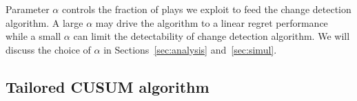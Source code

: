 \documentclass[letterpaper]{article} %
\begin{document}

Parameter $\alpha$ 
controls the fraction of plays we exploit to feed the change detection algorithm. A large $\alpha$ may drive the algorithm to a linear regret performance while a small $\alpha$ can limit the detectability of change detection algorithm. We will discuss the choice of $\alpha$ in Sections~\ref{sec:analysis} and~\ref{sec:simul}.

\subsection{Tailored CUSUM algorithm}
\end{document}
